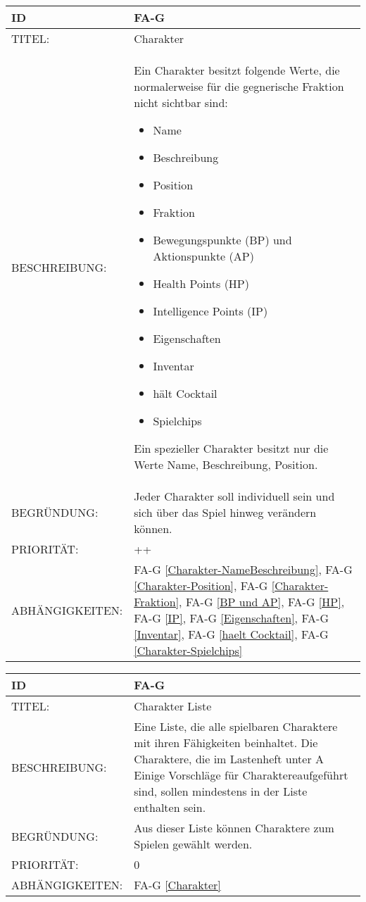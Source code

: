 \begin{tabularx}{16cm}{l|X}
	{table}\label{Charakter}
	\textbf{ID} & \textbf{FA-G \arabic{table}} \\
	\hline
	TITEL: & Charakter \\
	\hline
	BESCHREIBUNG: & Ein Charakter besitzt folgende Werte, die normalerweise für die gegnerische Fraktion nicht sichtbar sind: 
	\begin{itemize}
		\item Name
		\item Beschreibung
		\item Position
		\item Fraktion
		\item Bewegungspunkte (BP) und Aktionspunkte (AP)
		\item Health Points (HP)
		\item Intelligence Points (IP)
		\item Eigenschaften
		\item Inventar
		\item hält Cocktail
		\item Spielchips
	\end{itemize}
	Ein spezieller Charakter besitzt nur die Werte Name, Beschreibung, Position.
	\\
	\hline
	BEGRÜNDUNG: & Jeder Charakter soll individuell sein und sich über das Spiel hinweg verändern können.\\
	\hline
	PRIORITÄT: & ++\\
	\hline
	ABHÄNGIGKEITEN: & FA-G \ref{Charakter-NameBeschreibung}, FA-G \ref{Charakter-Position}, FA-G \ref{Charakter-Fraktion},  FA-G \ref{BP und AP}, FA-G \ref{HP}, FA-G \ref{IP}, FA-G \ref{Eigenschaften}, FA-G \ref{Inventar}, FA-G \ref{haelt Cocktail}, FA-G \ref{Charakter-Spielchips} \\
\end{tabularx}

\begin{tabularx}{16cm}{l|X}
	{table}\label{Charakter Liste}
	\textbf{ID} & \textbf{FA-G \arabic{table}} \\
	\hline
	TITEL: & Charakter Liste \\
	\hline
	BESCHREIBUNG: & Eine Liste, die alle spielbaren Charaktere mit ihren Fähigkeiten beinhaltet. Die Charaktere, die im Lastenheft unter \glqq A Einige Vorschläge für Charaktere\grqq aufgeführt sind, sollen mindestens in der Liste enthalten sein.\\
	\hline
	BEGRÜNDUNG: & Aus dieser Liste können Charaktere zum Spielen gewählt werden.\\
	\hline
	PRIORITÄT: & 0\\
	\hline
	ABHÄNGIGKEITEN: & FA-G \ref{Charakter}\\
\end{tabularx}

